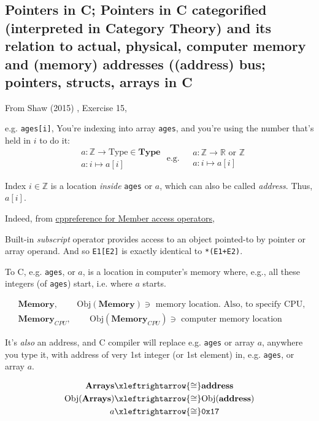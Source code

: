 \documentclass[10pt]{amsart}
\begin{document}
\begin{multicols*}{2}
\section{Pointers in C; Pointers in C categorified (interpreted in Category Theory) and its relation to actual, physical, computer memory and (memory) addresses ((address) bus; pointers, structs, arrays in C}

From Shaw (2015) \cite{Shaw2015}, Exercise 15, 

e.g. \verb|ages[i]|, You're indexing into array \verb|ages|, and you're using the number that's held in $i$ to do it:  
\[
\begin{aligned}
& a : \mathbb{Z} \to \text{Type} \in \textbf{Type}  \\
& a: i \mapsto a[i]
\end{aligned} \text{ e.g. } 
\begin{aligned}
& a: \mathbb{Z} \to \mathbb{R} \text{ or } \mathbb{Z}  \\
& a:i \mapsto a[i]
\end{aligned}
\]

Index $i\in \mathbb{Z}$ is a location \emph{inside} \verb|ages| or $a$, which can also be called \emph{address}.  Thus, $a[i]$.  

Indeed, from \href{http://en.cppreference.com/w/cpp/language/operator_member_access}{cppreference for Member access operators}, 

Built-in \emph{subscript} operator provides access to an object pointed-to by pointer or array operand.  And so \verb|E1[E2]| is exactly identical to \verb|*(E1+E2)|.  


To C, e.g. \verb|ages|, or $a$, is a location in computer's memory where, e.g., all these integers (of \verb|ages|) start, i.e. where $a$ starts.  

\[
\begin{aligned}
& \textbf{Memory} , \qquad \, \text{Obj}{(\textbf{Memory})} \ni \text{ memory location.  Also, to specify CPU, } \\ 
& \textbf{Memory}_{CPU} , \qquad \, \text{Obj}{(\textbf{Memory}_{CPU})} \ni \text{ computer memory location }
\end{aligned}
\]

It's \emph{also} an address, and C compiler will replace e.g. \verb|ages| or array $a$, anywhere you type it, with address of very 1st integer (or 1st element) in, e.g. \verb|ages|, or array $a$.  

\[
\begin{gathered}
	\begin{aligned}
	\textbf{Arrays} & \xleftrightarrow{ \cong } \textbf{address}  \\
	\text{Obj}{(\textbf{Arrays} )} & \xleftrightarrow{ \cong } \text{Obj}{(\textbf{address} )}  \\
	a & \xleftrightarrow{ \cong } \verb|0x17|  \\
	\end{aligned}
\end{gathered}
\]


\end{multicols*}
\end{document}
